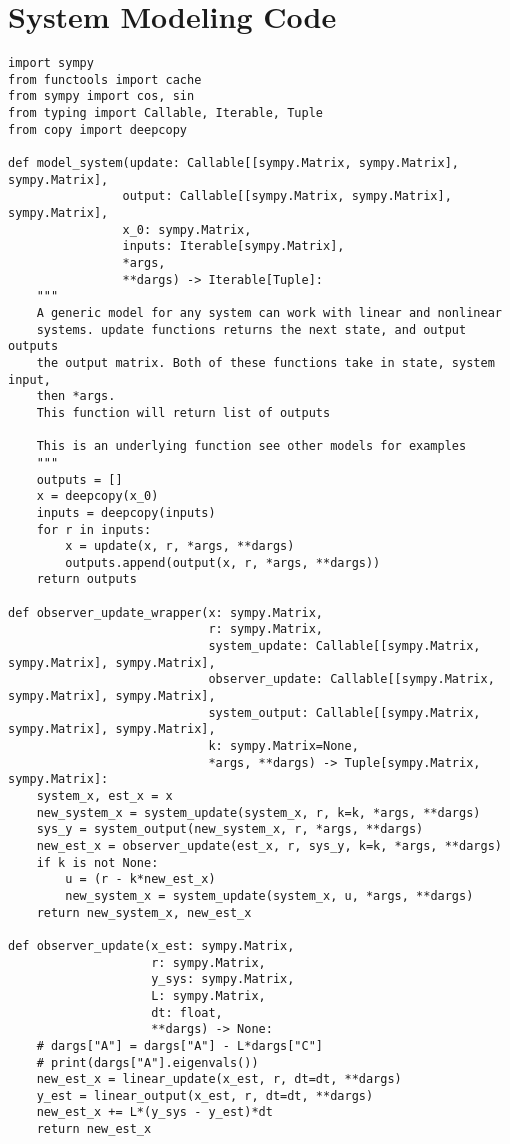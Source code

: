 \appendix

\vspace{2cm}
\section{System Modeling Code} \label{appendix:SystemModeling}
\begin{verbatim}
import sympy
from functools import cache
from sympy import cos, sin
from typing import Callable, Iterable, Tuple
from copy import deepcopy

def model_system(update: Callable[[sympy.Matrix, sympy.Matrix], sympy.Matrix],
                output: Callable[[sympy.Matrix, sympy.Matrix], sympy.Matrix],
                x_0: sympy.Matrix,
                inputs: Iterable[sympy.Matrix],
                *args,
                **dargs) -> Iterable[Tuple]:
    """
    A generic model for any system can work with linear and nonlinear
    systems. update functions returns the next state, and output outputs
    the output matrix. Both of these functions take in state, system input,
    then *args.
    This function will return list of outputs

    This is an underlying function see other models for examples
    """
    outputs = []
    x = deepcopy(x_0)
    inputs = deepcopy(inputs)
    for r in inputs:
        x = update(x, r, *args, **dargs)
        outputs.append(output(x, r, *args, **dargs))
    return outputs

def observer_update_wrapper(x: sympy.Matrix,
                            r: sympy.Matrix,
                            system_update: Callable[[sympy.Matrix, sympy.Matrix], sympy.Matrix],
                            observer_update: Callable[[sympy.Matrix, sympy.Matrix], sympy.Matrix],
                            system_output: Callable[[sympy.Matrix, sympy.Matrix], sympy.Matrix],
                            k: sympy.Matrix=None,
                            *args, **dargs) -> Tuple[sympy.Matrix, sympy.Matrix]:
    system_x, est_x = x
    new_system_x = system_update(system_x, r, k=k, *args, **dargs)
    sys_y = system_output(new_system_x, r, *args, **dargs)
    new_est_x = observer_update(est_x, r, sys_y, k=k, *args, **dargs)
    if k is not None:
        u = (r - k*new_est_x)
        new_system_x = system_update(system_x, u, *args, **dargs)
    return new_system_x, new_est_x

def observer_update(x_est: sympy.Matrix,
                    r: sympy.Matrix,
                    y_sys: sympy.Matrix,
                    L: sympy.Matrix,
                    dt: float,
                    **dargs) -> None:
    # dargs["A"] = dargs["A"] - L*dargs["C"]
    # print(dargs["A"].eigenvals())
    new_est_x = linear_update(x_est, r, dt=dt, **dargs)
    y_est = linear_output(x_est, r, dt=dt, **dargs)
    new_est_x += L*(y_sys - y_est)*dt
    return new_est_x
                    

\end{verbatim}
